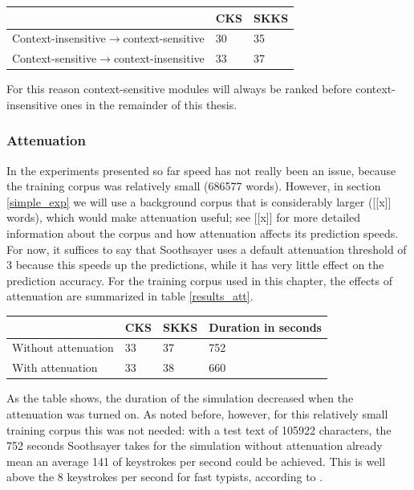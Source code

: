 \documentclass[12pt]{article}
\let\originaltable\table
\let\endoriginaltable\endtable
\renewenvironment{table}[1][ht]{%
  \originaltable[#1]
  \centering}%
  {\endoriginaltable}
\begin{document}
\begin{table}[h]
\begin{tabular}{l|ll} 
&CKS&SKKS\\
\hline
Context-insensitive$\rightarrow$context-sensitive&30&35\\
Context-sensitive$\rightarrow$context-insensitive&33&37\\
\end{tabular} 
\caption{Percentage of keystrokes Soothsayer saves with a context-sensitive module first and a context-insensitive module first} \label{results_concat}
\end{table}

For this reason context-sensitive modules will always be ranked before context-insensitive ones in the remainder of this thesis.

\subsubsection{Attenuation}


In the experiments presented so far speed has not really been an issue, because the training corpus was relatively small (686577 words). However, in section \ref{simple_exp} we will use a background corpus that is considerably larger ([[x]] words), which would make attenuation useful; see [[x]] for more detailed information about the corpus and how attenuation affects its prediction speeds. For now, it suffices to say that Soothsayer uses a default attenuation threshold of 3 because this speeds up the predictions, while it has very little effect on the prediction accuracy. For the training corpus used in this chapter, the effects of attenuation are summarized in table \ref{results_att}.

\begin{table}[h]
\begin{tabular}{l|lll} 

&CKS&SKKS&Duration in seconds\\
\hline
Without attenuation&33&37&752\\
With attenuation&33&38&660\\
\end{tabular} 
\caption{Percentage of keystrokes saved and simulation times with and without attenuation.} \label{results_att}
\end{table}

As the table shows, the duration of the simulation decreased when the attenuation was turned on. As noted before, however, for this relatively small training corpus this was not needed: with a test text of 105922 characters, the 752 seconds Soothsayer takes for the simulation without attenuation already mean an average 141 of keystrokes per second could be achieved. This is well above the 8 keystrokes per second for fast typists, according to .
\end{document}
